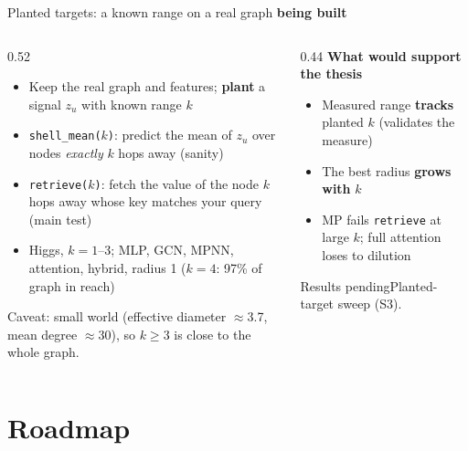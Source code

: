 \documentclass[aspectratio=169,10pt]{beamer}
\newcommand{\snote}[1]{{\scriptsize\textcolor{ink!70}{#1}}}
\newcommand{\sbuild}{\textcolor{warm}{\textbf{being built}}}
\newcommand{\pending}[1]{\begin{alertblock}{Results pending}\small #1\end{alertblock}}
\begin{document}
\begin{frame}{Planted targets: a known range on a real graph \sbuild}
  \begin{columns}[T]
    \begin{column}{0.52\textwidth}
      \begin{itemize}\small
        \item Keep the real graph and features; \textbf{plant} a signal $z_u$ with known range $k$
        \item \texttt{shell\_mean($k$)}: predict the mean of $z_u$ over nodes \emph{exactly} $k$ hops away \snote{(sanity)}
        \item \texttt{retrieve($k$)}: fetch the value of the node $k$ hops away whose key matches your query \snote{(main test)}
        \item Higgs, $k = 1$--3; MLP, GCN, MPNN, attention, hybrid, radius 1 \snote{($k=4$: 97\% of graph in reach)}
      \end{itemize}
      \snote{Caveat: small world (effective diameter $\approx$3.7, mean degree $\approx$30), so $k \ge 3$ is close to the whole graph.}
    \end{column}
    \begin{column}{0.44\textwidth}
      \textbf{What would support the thesis}
      \begin{itemize}\small
        \item Measured range \textbf{tracks} planted $k$ (validates the measure)
        \item The best radius \textbf{grows with} $k$
        \item MP fails \texttt{retrieve} at large $k$; full attention loses to dilution
      \end{itemize}
      \pending{Planted-target sweep (S3).}
    \end{column}
  \end{columns}
\end{frame}

\section{Roadmap}
\end{document}
